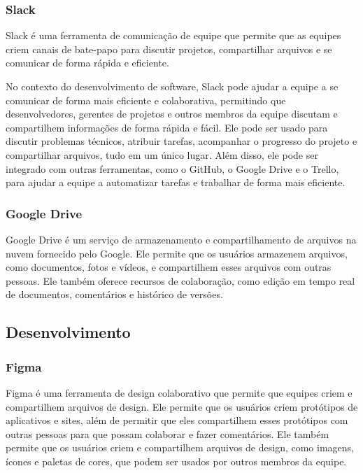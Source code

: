 \subsubsection{Slack}

Slack é uma ferramenta de comunicação de equipe que permite que as equipes criem canais de bate-papo para discutir projetos, compartilhar arquivos e se comunicar de forma rápida e eficiente.

No contexto do desenvolvimento de software, Slack pode ajudar a equipe a se comunicar de forma mais eficiente e colaborativa, permitindo que desenvolvedores, gerentes de projetos e outros membros da equipe discutam e compartilhem informações de forma rápida e fácil. Ele pode ser usado para discutir problemas técnicos, atribuir tarefas, acompanhar o progresso do projeto e compartilhar arquivos, tudo em um único lugar. Além disso, ele pode ser integrado com outras ferramentas, como o GitHub, o Google Drive e o Trello, para ajudar a equipe a automatizar tarefas e trabalhar de forma mais eficiente.

\subsubsection{Google Drive}

Google Drive é um serviço de armazenamento e compartilhamento de arquivos na nuvem fornecido pelo Google. Ele permite que os usuários armazenem arquivos, como documentos, fotos e vídeos, e compartilhem esses arquivos com outras pessoas. Ele também oferece recursos de colaboração, como edição em tempo real de documentos, comentários e histórico de versões. 

\subsection{Desenvolvimento}

\subsubsection{Figma}

Figma é uma ferramenta de design colaborativo que permite que equipes criem e compartilhem arquivos de design. Ele permite que os usuários criem protótipos de aplicativos e sites, além de permitir que eles compartilhem esses protótipos com outras pessoas para que possam colaborar e fazer comentários. Ele também permite que os usuários criem e compartilhem arquivos de design, como imagens, ícones e paletas de cores, que podem ser usados por outros membros da equipe.

